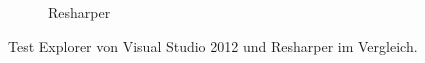 \begin{figure}[t]
\begin{subfigure}[b]{0.8\textwidth}
	\caption{Resharper}
	\label{fig:ResharperTestExplorer}
	\end{subfigure}
\caption[Test Explorer von Visual Studio 2012 und Resharper im Vergleich]{Test Explorer von Visual Studio 2012 und Resharper im Vergleich.}
\label{fig:TestExplorerComparison}
\end{figure}
